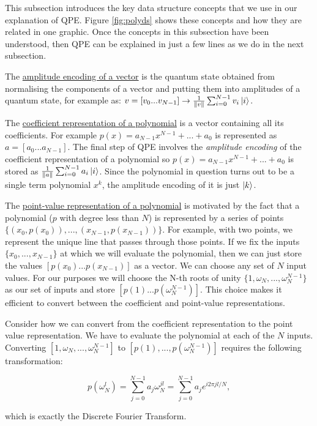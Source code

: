 \documentclass[12pt, a4paper]{article}
\begin{document}
	This subsection introduces the key data structure concepts that we use in our explanation of QPE. Figure \ref{fig:polyds} shows these concepts and how they are related in one graphic. Once the concepts in this subsection have been understood, then QPE can be explained in just a few lines as we do in the next subsection.
	
	The \underline{amplitude encoding of a vector} is the quantum state obtained from normalising the components of a vector and putting them into amplitudes of a quantum state, for example as: $v= [v_0 ... v_{N-1}] \rightarrow \frac{1}{\norm{v}} \sum_{i=0}^{N-1} v_i \ket{i}$.
	
	The \underline{coefficient representation of a polynomial} is a vector containing all its coefficients. For example $p(x) = a_{N-1}x^{N-1} + ... + a_0$ is represented as $a = [a_0 ... a_{N-1}]$. The final step of QPE involves the \textit{amplitude encoding} of the coefficient representation of a polynomial so $p(x) = a_{N-1}x^{N-1} + ... + a_0$ is stored as $\frac{1}{\norm{a}} \sum_{i=0}^{N-1} a_i \ket{i}$. Since the polynomial in question turns out to be a single term polynomial $x^k$, the amplitude encoding of it is just $\ket{k}$. 
	
	The \underline{point-value representation of a polynomial} is motivated by the fact that a polynomial ($p$ with degree less than $N$) is represented by a series of points $\{(x_0,p(x_0)), ..., (x_{N-1},p(x_{N-1}))\}$. For example, with two points, we represent the unique line that passes through those points. If we fix the inputs $\{x_0, ..., x_{N-1}\}$ at which we will evaluate the polynomial, then we can just store the values $[p(x_0)...p(x_{N-1})]$ as a vector. We can choose any set of $N$ input values. For our purposes we will choose the N-th roots of unity $\{1,\omega_N, ..., \omega_N^{N-1}\}$ as our set of inputs and store $[p(1)...p(\omega_N^{N-1})]$. This choice makes it efficient to convert between the coefficient and point-value representations. 
	
	Consider how we can convert from the coefficient representation to the point value representation. We have to evaluate the polynomial at each of the $N$ inputs. Converting $[1,\omega_N, ..., \omega_N^{N-1}]$ to  $[p(1),...,p(\omega_N^{N-1})]$ requires the following transformation:

	$$p(\omega_N^l) = \sum_{j=0}^{N-1} a_j \omega_N^{jl} = \sum_{j=0}^{N-1} a_j e^{i2\pi jl/N},$$
	
	which is exactly the Discrete Fourier Transform. 
	
\end{document}
